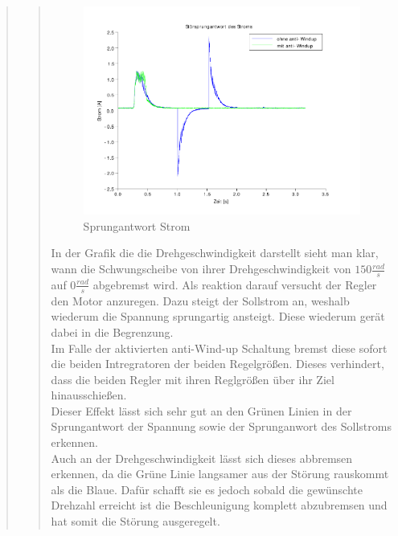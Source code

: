 \begin{quote}
\begin{quote}
        \begin{figure}[H]
        \centering
            \includegraphics[scale=0.8, trim = 0.5cm 0.5cm 2cm 0.5cm,
            clip]{./Bilder/windup_sprungantwort_Strom}    
            \caption{Sprungantwort Strom}
        \end{figure}    
        
        In der Grafik die die Drehgeschwindigkeit darstellt sieht man klar, wann die Schwungscheibe von ihrer
        Drehgeschwindigkeit von $150 \frac{rad}{s}$ auf $0\frac{rad}{s}$ abgebremst wird. Als reaktion darauf versucht
        der Regler den Motor anzuregen. Dazu steigt der Sollstrom an, weshalb wiederum die Spannung sprungartig
        ansteigt. Diese wiederum gerät dabei in die Begrenzung.\\
        Im Falle der aktivierten anti-Wind-up Schaltung bremst diese sofort die beiden Intregratoren der beiden
        Regelgrößen. Dieses verhindert, dass die beiden Regler mit ihren Reglgrößen über ihr Ziel hinausschießen.\\
        Dieser Effekt lässt sich sehr gut an den Grünen Linien in der Sprungantwort der Spannung sowie der
        Sprunganwort des Sollstroms erkennen.\\
        Auch an der Drehgeschwindigkeit lässt sich dieses abbremsen erkennen, da die Grüne Linie langsamer aus der
        Störung rauskommt als die Blaue. Dafür schafft sie es jedoch sobald die gewünschte Drehzahl erreicht ist die
        Beschleunigung komplett abzubremsen und hat somit die Störung ausgeregelt.\vspace{1em}
        

\end{quote}
\end{quote}
